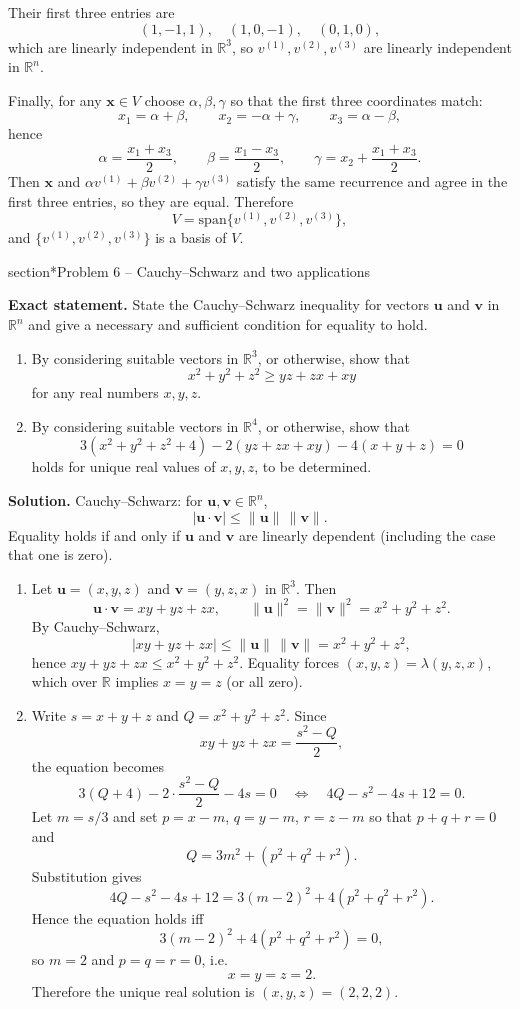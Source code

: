\documentclass[12pt,a4paper]{article}
\theoremstyle{plain}
\theoremstyle{definition}      %
\begin{document}
Their first three entries are
\[
(1,-1,1),\quad (1,0,-1),\quad (0,1,0),
\]
which are linearly independent in $\mathbb{R}^3$, so $v^{(1)},v^{(2)},v^{(3)}$ are linearly independent in $\mathbb{R}^n$.

Finally, for any $\mathbf{x}\in V$ choose $\alpha,\beta,\gamma$ so that the first three coordinates match:
\[
x_1=\alpha+\beta,\qquad x_2=-\alpha+\gamma,\qquad x_3=\alpha-\beta,
\]
hence
\[
\alpha=\frac{x_1+x_3}{2},\qquad
\beta=\frac{x_1-x_3}{2},\qquad
\gamma=x_2+\frac{x_1+x_3}{2}.
\]
Then $\mathbf{x}$ and $\alpha v^{(1)}+\beta v^{(2)}+\gamma v^{(3)}$ satisfy the same recurrence and agree in the first three entries, so they are equal. Therefore
\[
V=\mathrm{span}\{v^{(1)},v^{(2)},v^{(3)}\},
\]
and $\{v^{(1)},v^{(2)},v^{(3)}\}$ is a basis of $V$.

section*{Problem 6 -- Cauchy--Schwarz and two applications}

\textbf{Exact statement.}
State the Cauchy--Schwarz inequality for vectors $\mathbf u$ and $\mathbf v$ in $\mathbb{R}^n$ and give a necessary and sufficient condition for equality to hold.
\begin{enumerate}[label=(\alph*)]
	\item By considering suitable vectors in $\mathbb{R}^3$, or otherwise, show that
	\[
	x^2+y^2+z^2 \ge yz+zx+xy
	\]
	for any real numbers $x,y,z$.
	\item By considering suitable vectors in $\mathbb{R}^4$, or otherwise, show that
	\[
	3(x^2+y^2+z^2+4)-2(yz+zx+xy)-4(x+y+z)=0
	\]
	holds for unique real values of $x,y,z$, to be determined.
\end{enumerate}

\textbf{Solution.}
Cauchy--Schwarz: for $\mathbf u,\mathbf v\in\mathbb{R}^n$,
\[
|\mathbf u\cdot \mathbf v|\le \|\mathbf u\|\,\|\mathbf v\|.
\]
Equality holds if and only if $\mathbf u$ and $\mathbf v$ are linearly dependent (including the case that one is zero).

\begin{enumerate}[label=(\alph*)]
	\item Let $\mathbf u=(x,y,z)$ and $\mathbf v=(y,z,x)$ in $\mathbb{R}^3$. Then
	\[
	\mathbf u\cdot\mathbf v=xy+yz+zx,\qquad
	\|\mathbf u\|^2=\|\mathbf v\|^2=x^2+y^2+z^2.
	\]
	By Cauchy--Schwarz,
	\[
	|xy+yz+zx|\le \|\mathbf u\|\,\|\mathbf v\|=x^2+y^2+z^2,
	\]
	hence $xy+yz+zx\le x^2+y^2+z^2$.
	Equality forces $(x,y,z)=\lambda(y,z,x)$, which over $\mathbb{R}$ implies $x=y=z$ (or all zero).
	\item Write $s=x+y+z$ and $Q=x^2+y^2+z^2$. Since
	\[
	xy+yz+zx=\frac{s^2-Q}{2},
	\]
	the equation becomes
	\[
	3(Q+4)-2\cdot\frac{s^2-Q}{2}-4s=0
	\quad\Longleftrightarrow\quad
	4Q-s^2-4s+12=0.
	\]
	Let $m=s/3$ and set $p=x-m$, $q=y-m$, $r=z-m$ so that $p+q+r=0$ and
	\[
	Q=3m^2+(p^2+q^2+r^2).
	\]
	Substitution gives
	\[
	4Q-s^2-4s+12
	=3(m-2)^2+4(p^2+q^2+r^2).
	\]
	Hence the equation holds iff
	\[
	3(m-2)^2+4(p^2+q^2+r^2)=0,
	\]
	so $m=2$ and $p=q=r=0$, i.e.
	\[
	x=y=z=2.
	\]
	Therefore the unique real solution is $(x,y,z)=(2,2,2)$.
\end{enumerate}
\end{document}
